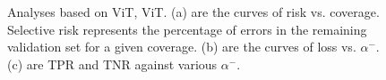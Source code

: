 \begin{figure}[!b]
	\centering
	 \hfill
	 \hfill
	\caption{\label{fig:anal_abl}
    	Analyses based on \textlangle ViT, ViT\textrangle. (a) are the curves of risk vs. coverage. Selective risk represents the percentage of errors in the remaining validation set for a given coverage. (b) are the curves of loss vs. $\alpha^{-}$. (c) are TPR and TNR against various $\alpha^{-}$.
    	}
\end{figure}